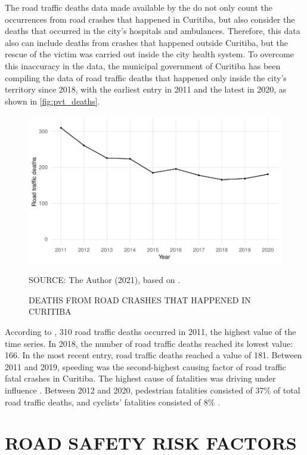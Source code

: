 The road traffic deaths data made available by the \textcite{MinistryofHealth2020} do not only count the occurrences from road crashes that happened in Curitiba, but also consider the deaths that occurred in the city's hospitals and ambulances. Therefore, this data also can include deaths from crashes that happened outside Curitiba, but the rescue of the victim was carried out inside the city health system. To overcome this inaccuracy in the data, the municipal government of Curitiba has been compiling the data of road traffic deaths that happened only inside the city's territory since 2018, with the earliest entry in 2011 and the latest in 2020, as shown in \autoref{fig:pvt_deaths}.  

\begin{figure}[!htbp]
    \centering\footnotesize
    \captionsetup{font=footnotesize}
    \caption{DEATHS FROM ROAD CRASHES THAT HAPPENED IN CURITIBA}
    \includegraphics{fig/pvt_plot.pdf}
    \label{fig:pvt_deaths}
    \par SOURCE: The Author (2021), based on \textcite{Curitiba2021}.
\end{figure} 

According to \textcite{Curitiba2021}, 310 road traffic deaths occurred in 2011, the highest value of the time series. In 2018, the number of road traffic deaths reached its lowest value: 166. In the most recent entry, road traffic deaths reached a value of 181. Between 2011 and 2019, speeding was the second-highest causing factor of road traffic fatal crashes in Curitiba. The highest cause of fatalities was driving under influence \cite{Curitiba2020}. Between 2012 and 2020, pedestrian fatalities consisted of 37\% of total road traffic deaths, and cyclists' fatalities consisted of 8\% \cite{Curitiba2021}.

\section{ROAD SAFETY RISK FACTORS} \label{sec:risk}

